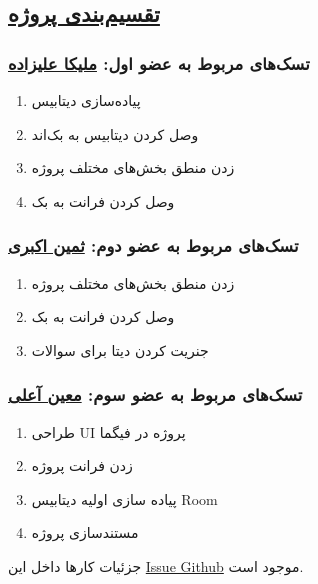 \subsection*{\underline{تقسیم‌بندی پروژه}}
\subsubsection*{تسک‌های مربوط به عضو اول: \href{https://github.com/MelikaAlizadeh}{ملیکا علیزاده}}
\begin{enumerate}
	
	\item پیاده‌سازی دیتابیس
	
	\item وصل کردن دیتابیس به بک‌اند
	
	\item زدن منطق بخش‌های مختلف پروژه
	
	\item وصل کردن فرانت به بک
	
\end{enumerate}
\subsubsection*{تسک‌های مربوط به عضو دوم: \href{https://github.com/saminakbari}{ثمین اکبری} }
\begin{enumerate}
	
	\item زدن منطق بخش‌های مختلف پروژه
	
	\item وصل کردن فرانت به بک
	
	\item جنریت کردن دیتا برای سوالات
	
\end{enumerate}
\subsubsection*{تسک‌های مربوط به عضو سوم: \href{https://github.com/MoeeinAali}{معین آعلی}}
\begin{enumerate}
	
	\item طراحی UI پروژه در فیگما
	
	\item زدن فرانت پروژه
	
	\item پیاده سازی اولیه دیتابیس Room
	
	\item مستندسازی پروژه
	
	
\end{enumerate}

جزئیات کارها داخل این 
\href{https://github.com/MelikaAlizadeh/Mobile-Project/issues/1}{Issue Github}
موجود است.